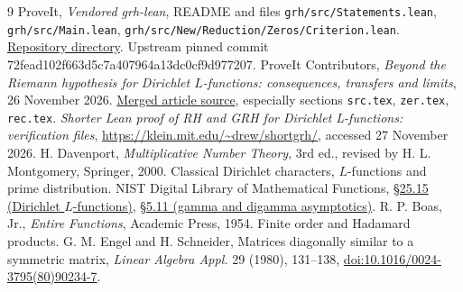 \documentclass[11pt]{article}
\theoremstyle{definition}\newtheorem{definition}[theorem]{Definition}
\begin{document}
\begin{thebibliography}{9}\small
{} ProveIt, \emph{Vendored grh-lean}, README and files \texttt{grh/src/Statements.lean}, \texttt{grh/src/Main.lean}, \texttt{grh/src/New/Reduction/\allowbreak Zeros/Criterion.lean}. \href{https://github.com/VladimirReshetnikov/ProveIt/tree/main/Analysis/GeneralizedRiemannHypothesis/vendor/grh-lean}{Repository directory}. Upstream pinned commit 72fead102f663d5c7a407964a13dc0cf9d977207.
 ProveIt Contributors, \emph{Beyond the Riemann hypothesis for Dirichlet $L$-functions: consequences, transfers and limits}, 26 November 2026. \href{https://github.com/VladimirReshetnikov/ProveIt/tree/main/Analysis/GeneralizedRiemannHypothesis/Article}{Merged article source}, especially sections \texttt{src.tex}, \texttt{zer.tex}, \texttt{rec.tex}.
 \emph{Shorter Lean proof of RH and GRH for Dirichlet L-functions: verification files}, \url{https://klein.mit.edu/~drew/shortgrh/}, accessed 27 November 2026.
 H. Davenport, \emph{Multiplicative Number Theory}, 3rd ed., revised by H. L. Montgomery, Springer, 2000. Classical Dirichlet characters, $L$-functions and prime distribution.
 NIST Digital Library of Mathematical Functions, \href{https://dlmf.nist.gov/25.15}{\S25.15 (Dirichlet $L$-functions)}, \href{https://dlmf.nist.gov/5.11}{\S5.11 (gamma and digamma asymptotics)}.
 R. P. Boas, Jr., \emph{Entire Functions}, Academic Press, 1954. Finite order and Hadamard products.
 G. M. Engel and H. Schneider, Matrices diagonally similar to a symmetric matrix, \emph{Linear Algebra Appl.} 29 (1980), 131--138, \href{https://doi.org/10.1016/0024-3795(80)90234-7}{doi:10.1016/0024-3795(80)90234-7}.
\end{thebibliography}
\end{document}
